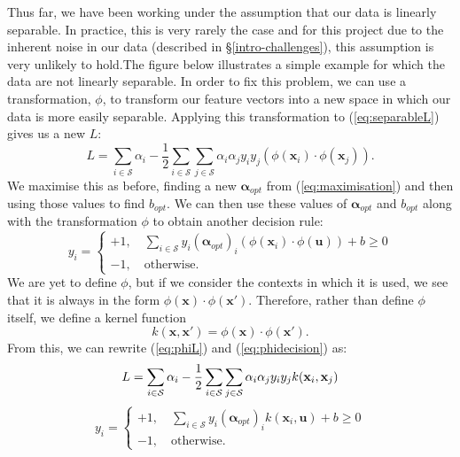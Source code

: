 \documentclass[12pt,a4paper,twoside,openright]{report}
\begin{document}
Thus far, we have been working under the assumption that our data is linearly separable. In practice, this is very rarely the case and for this project due to the inherent noise in our data (described in \S \ref{intro-challenges}), this assumption is very unlikely to hold.The figure below illustrates a simple example for which the data are not linearly separable.
\newline
\newline
In order to fix this problem, we can use a transformation, $\phi$, to transform our feature vectors into a new space in which our data is more easily separable. Applying this transformation to (\ref{eq:separableL}) gives us a new $L$:
\begin{equation} \label{eq:phiL}
	L = \sum_{i \in \mathcal{S}} \alpha_i - \frac{1}{2}\sum_{i \in \mathcal{S}} \sum_{j \in \mathcal{S}} \alpha_i \alpha_j y_i y_j (\phi (\mathbf{x}_i) \cdot \phi (\mathbf{x}_j)).
\end{equation}
We maximise this as before, finding a new $\boldsymbol{\alpha}_{opt}$ from (\ref{eq:maximisation}) and then using those values to find $b_{opt}$. We can then use these values of $\boldsymbol{\alpha}_{opt}$ and $b_{opt}$ along with the transformation $\phi$ to obtain another decision rule:
\begin{equation} \label{eq:phidecision}
	y_i =
	\begin{cases}
		+1, \quad \displaystyle \sum_{i \in \mathcal{S}} y_i(\boldsymbol{\alpha}_{opt})_i (\phi (\mathbf{x}_i) \cdot \phi (\mathbf{u})) + b \ge 0 \\
		-1, \quad \text{otherwise}.
	\end{cases}
\end{equation}
We are yet to define $\phi$, but if we consider the contexts in which it is used, we see that it is always in the form $\phi (\mathbf{x}) \cdot \phi (\mathbf{x}')$. Therefore, rather than define $\phi$ itself, we define a kernel function
\begin{equation}
	k(\mathbf{x}, \mathbf{x}') = \phi (\mathbf{x}) \cdot \phi (\mathbf{x}').
\end{equation}
From this, we can rewrite (\ref{eq:phiL}) and (\ref{eq:phidecision}) as:
\begin{equation}
	L = \sum_{i \in \mathcal{S}} \alpha_i - \frac{1}{2}\sum_{i \in \mathcal{S}} \sum_{j \in \mathcal{S}} \alpha_i \alpha_j y_i y_j k(\mathbf{x}_i, \mathbf{x}_j) \\
\end{equation}
\begin{equation}
	y_i =
	\begin{cases}
		+1, \quad \displaystyle \sum_{i \in \mathcal{S}} y_i(\boldsymbol{\alpha}_{opt})_i k(\mathbf{x}_i, \mathbf{u}) + b \ge 0 \\
		-1, \quad \text{otherwise}.
	\end{cases}
\end{equation}
\end{document}
